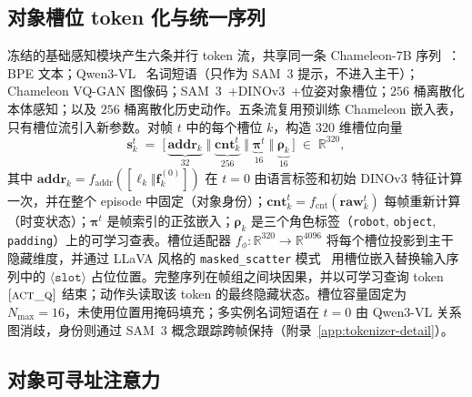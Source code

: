 \documentclass{article}
\begin{document}
\subsection{对象槽位 token 化与统一序列}
\label{sec:method:slot}

冻结的基础感知模块产生六条并行 token 流，共享同一条 Chameleon-7B 序列~\citep{chameleon,luminamgpt}：BPE 文本；Qwen3-VL~\citep{qwen3vl} 名词短语（只作为 SAM~3 提示，不进入主干）；Chameleon VQ-GAN 图像码；SAM~3~\citep{sam3}+DINOv3~\citep{dinov3}+位姿对象槽位；$256$ 桶离散化本体感知；以及 $256$ 桶离散化历史动作。五条流复用预训练 Chameleon 嵌入表，只有槽位流引入新参数。对帧 $t$ 中的每个槽位 $k$，构造 $320$ 维槽位向量
\begin{equation}
\mathbf{s}_k^t \;=\; \bigl[\,\underbrace{\mathbf{addr}_k}_{32}\;\big\Vert\;\underbrace{\mathbf{cnt}_k^t}_{256}\;\big\Vert\;\underbrace{\boldsymbol{\pi}^t}_{16}\;\big\Vert\;\underbrace{\boldsymbol{\rho}_k}_{16}\,\bigr]\;\in\;\mathbb{R}^{320},
\label{eq:slot}
\end{equation}
其中 $\mathbf{addr}_k\!=\!f_\mathrm{addr}([\boldsymbol{\ell}_k\Vert\mathbf{f}_k^{(0)}])$ 在 $t{=}0$ 由语言标签和初始 DINOv3 特征计算一次，并在整个 episode 中固定（对象身份）；$\mathbf{cnt}_k^t\!=\!f_\mathrm{cnt}(\mathbf{raw}_k^t)$ 每帧重新计算（时变状态）；$\boldsymbol{\pi}^t$ 是帧索引的正弦嵌入；$\boldsymbol{\rho}_k$ 是三个角色标签（\texttt{robot}, \texttt{object}, \texttt{padding}）上的可学习查表。槽位适配器 $f_\phi\!:\!\mathbb{R}^{320}\!\to\!\mathbb{R}^{4096}$ 将每个槽位投影到主干隐藏维度，并通过 LLaVA 风格的 \texttt{masked\_scatter} 模式~\citep{llava,idefics2} 用槽位嵌入替换输入序列中的 $\langle\texttt{slot}\rangle$ 占位位置。完整序列在帧组之间块因果，并以可学习查询 token $\textsc{[act\_q]}$ 结束；动作头读取该 token 的最终隐藏状态。槽位容量固定为 $N_{\max}{=}16$，未使用位置用掩码填充；多实例名词短语在 $t{=}0$ 由 Qwen3-VL 关系图消歧，身份则通过 SAM~3 概念跟踪跨帧保持（附录~\ref{app:tokenizer-detail}）。

\subsection{对象可寻址注意力}
\label{sec:method:oa}
\end{document}
